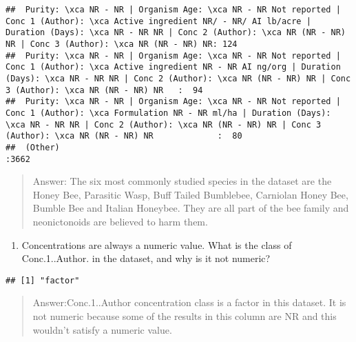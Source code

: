 \documentclass[]{article}
\newenvironment{Shaded}{\begin{snugshade}}{\end{snugshade}}
\newcommand{\DecValTok}[1]{\textcolor[rgb]{0.00,0.00,0.81}{#1}}
\newcommand{\KeywordTok}[1]{\textcolor[rgb]{0.13,0.29,0.53}{\textbf{#1}}}
\newcommand{\NormalTok}[1]{#1}
\newcommand{\OperatorTok}[1]{\textcolor[rgb]{0.81,0.36,0.00}{\textbf{#1}}}
\providecommand{\tightlist}{%
  \setlength{\itemsep}{0pt}\setlength{\parskip}{0pt}}
\begin{document}
\begin{verbatim}
##  Purity: \xca NR - NR | Organism Age: \xca NR - NR Not reported | Conc 1 (Author): \xca Active ingredient NR/ - NR/ AI lb/acre | Duration (Days): \xca NR - NR NR | Conc 2 (Author): \xca NR (NR - NR) NR | Conc 3 (Author): \xca NR (NR - NR) NR: 124  
##  Purity: \xca NR - NR | Organism Age: \xca NR - NR Not reported | Conc 1 (Author): \xca Active ingredient NR - NR AI ng/org | Duration (Days): \xca NR - NR NR | Conc 2 (Author): \xca NR (NR - NR) NR | Conc 3 (Author): \xca NR (NR - NR) NR   :  94  
##  Purity: \xca NR - NR | Organism Age: \xca NR - NR Not reported | Conc 1 (Author): \xca Formulation NR - NR ml/ha | Duration (Days): \xca NR - NR NR | Conc 2 (Author): \xca NR (NR - NR) NR | Conc 3 (Author): \xca NR (NR - NR) NR             :  80  
##  (Other)                                                                                                                                                                                                                                         :3662
\end{verbatim}

\begin{quote}
Answer: The six most commonly studied species in the dataset are the
Honey Bee, Parasitic Wasp, Buff Tailed Bumblebee, Carniolan Honey Bee,
Bumble Bee and Italian Honeybee. They are all part of the bee family and
neonictonoids are believed to harm them.
\end{quote}

\begin{enumerate}
\def\labelenumi{\arabic{enumi}.}
\setcounter{enumi}{7}
\tightlist
\item
  Concentrations are always a numeric value. What is the class of
  Conc.1..Author. in the dataset, and why is it not numeric?
\end{enumerate}

\begin{Shaded}
\end{Shaded}

\begin{verbatim}
## [1] "factor"
\end{verbatim}

\begin{quote}
Answer:Conc.1..Author concentration class is a factor in this dataset.
It is not numeric because some of the results in this column are NR and
this wouldn't satisfy a numeric value.
\end{quote}
\end{document}
